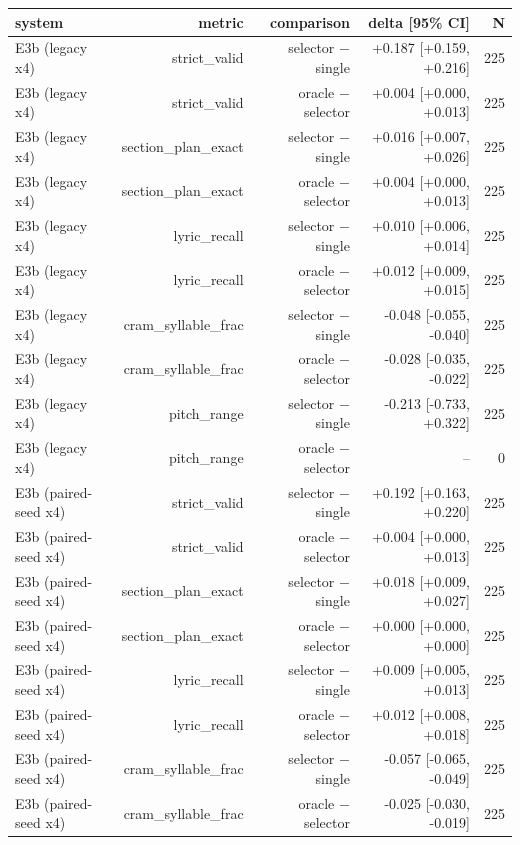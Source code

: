 \begin{table}[t]
\centering
\small
\begin{tabular}{lrrrr}
\toprule
system & metric & comparison & delta [95\% CI] & N \\
\midrule
E3b (legacy x4) & strict\_valid & selector $-$ single & +0.187 [+0.159, +0.216] & 225 \\
E3b (legacy x4) & strict\_valid & oracle $-$ selector & +0.004 [+0.000, +0.013] & 225 \\
E3b (legacy x4) & section\_plan\_exact & selector $-$ single & +0.016 [+0.007, +0.026] & 225 \\
E3b (legacy x4) & section\_plan\_exact & oracle $-$ selector & +0.004 [+0.000, +0.013] & 225 \\
E3b (legacy x4) & lyric\_recall & selector $-$ single & +0.010 [+0.006, +0.014] & 225 \\
E3b (legacy x4) & lyric\_recall & oracle $-$ selector & +0.012 [+0.009, +0.015] & 225 \\
E3b (legacy x4) & cram\_syllable\_frac & selector $-$ single & -0.048 [-0.055, -0.040] & 225 \\
E3b (legacy x4) & cram\_syllable\_frac & oracle $-$ selector & -0.028 [-0.035, -0.022] & 225 \\
E3b (legacy x4) & pitch\_range & selector $-$ single & -0.213 [-0.733, +0.322] & 225 \\
E3b (legacy x4) & pitch\_range & oracle $-$ selector & – & 0 \\
E3b (paired-seed x4) & strict\_valid & selector $-$ single & +0.192 [+0.163, +0.220] & 225 \\
E3b (paired-seed x4) & strict\_valid & oracle $-$ selector & +0.004 [+0.000, +0.013] & 225 \\
E3b (paired-seed x4) & section\_plan\_exact & selector $-$ single & +0.018 [+0.009, +0.027] & 225 \\
E3b (paired-seed x4) & section\_plan\_exact & oracle $-$ selector & +0.000 [+0.000, +0.000] & 225 \\
E3b (paired-seed x4) & lyric\_recall & selector $-$ single & +0.009 [+0.005, +0.013] & 225 \\
E3b (paired-seed x4) & lyric\_recall & oracle $-$ selector & +0.012 [+0.008, +0.018] & 225 \\
E3b (paired-seed x4) & cram\_syllable\_frac & selector $-$ single & -0.057 [-0.065, -0.049] & 225 \\
E3b (paired-seed x4) & cram\_syllable\_frac & oracle $-$ selector & -0.025 [-0.030, -0.019] & 225 \\

\end{tabular}
\end{table}
